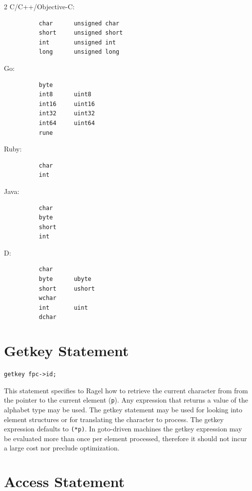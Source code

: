\documentclass[letterpaper,11pt,oneside]{book}
\newcommand{\verbspace}{\vspace{10pt}}
\begin{document}
\begin{multicols}{2}
\setlength{\columnseprule}{1pt} 
C/C++/Objective-C:
\begin{verbatim}
          char      unsigned char      
          short     unsigned short
          int       unsigned int
          long      unsigned long
\end{verbatim}

Go:
\begin{verbatim}
          byte
          int8      uint8
          int16     uint16
          int32     uint32
          int64     uint64
          rune
\end{verbatim}

Ruby: 
\begin{verbatim}
          char 
          int
\end{verbatim}

\columnbreak

Java:
\begin{verbatim}
          char 
          byte 
          short 
          int
\end{verbatim}

D:
\begin{verbatim}
          char 
          byte      ubyte   
          short     ushort 
          wchar 
          int       uint 
          dchar
\end{verbatim}

\end{multicols}

\section{Getkey Statement}

\begin{verbatim}
getkey fpc->id;
\end{verbatim}
\verbspace

This statement specifies to Ragel how to retrieve the current character from 
from the pointer to the current element (\verb|p|). Any expression that returns
a value of the alphabet type
may be used. The getkey statement may be used for looking into element
structures or for translating the character to process. The getkey expression
defaults to \verb|(*p)|. In goto-driven machines the getkey expression may be
evaluated more than once per element processed, therefore it should not incur a
large cost nor preclude optimization.

\section{Access Statement}
\end{document}
